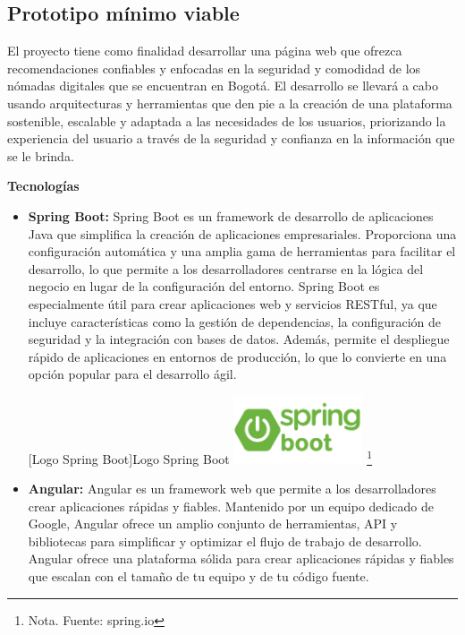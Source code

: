 \subsection{Prototipo mínimo viable}
El proyecto tiene como finalidad desarrollar una página web que ofrezca recomendaciones confiables y enfocadas en la seguridad y comodidad de los nómadas digitales que se encuentran en Bogotá. El desarrollo se llevará a cabo usando arquitecturas y herramientas que den pie a la creación de una plataforma sostenible, escalable y adaptada a las necesidades de los usuarios, priorizando la experiencia del usuario a través de la seguridad y confianza en la información que se le brinda.

\textbf{Tecnologías}
\begin{itemize}
    \item \textbf{Spring Boot: } Spring Boot es un framework de desarrollo de aplicaciones Java que simplifica la creación de aplicaciones empresariales. Proporciona una configuración automática y una amplia gama de herramientas para facilitar el desarrollo, lo que permite a los desarrolladores centrarse en la lógica del negocio en lugar de la configuración del entorno.
    Spring Boot es especialmente útil para crear aplicaciones web y servicios RESTful, ya que incluye características como la gestión de dependencias, la configuración de seguridad y la integración con bases de datos. Además, permite el despliegue rápido de aplicaciones en entornos de producción, lo que lo convierte en una opción popular para el desarrollo ágil.
    \vspace{2mm}
    \begin{minipage}{0.9\textwidth}
        \centering
        [{Logo Spring Boot}]{Logo Spring Boot}
        \label{Firestore}
         \includegraphics[width=0.3\textwidth]{Content/Images/spring-boot-logo.png}
        \footnote{Nota. \textup{Fuente: spring.io}}
    \end{minipage}

    \item \textbf{Angular: } Angular es un framework web que permite a los desarrolladores crear aplicaciones rápidas y fiables.
    Mantenido por un equipo dedicado de Google, Angular ofrece un amplio conjunto de herramientas, API y bibliotecas para simplificar y optimizar el flujo de trabajo de desarrollo. Angular ofrece una plataforma sólida para crear aplicaciones rápidas y fiables que escalan con el tamaño de tu equipo y de tu código fuente.


\end{itemize}
